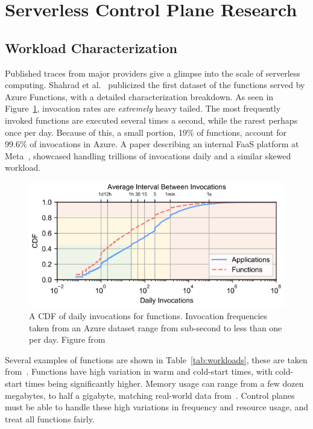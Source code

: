 \section{Serverless Control Plane Research}
\label{sec:related}


\subsection{Workload Characterization}
Published traces from major providers give a glimpse into the scale of serverless computing.
Shahrad et al.~\cite{shahrad_serverless_2020} publicized the first dataset of the functions served by Azure Functions, with a detailed characterization breakdown.
As seen in Figure~\ref{fig:wild-invokes}, invocation rates are \emph{extremely} heavy tailed.
The most frequently invoked functions are executed several times a second, while the rarest perhaps once per day.
Because of this, a small portion, 19\% of functions, account for 99.6\% of invocations in Azure.
A paper describing an internal FaaS platform at Meta~\cite{sahraei2023xfaas}, showcased handling trillions of invocations daily and a similar skewed workload.

\begin{figure}
  \begin{center}
    \includegraphics[width=.9\columnwidth]{./figures/wild-invocations.png}
    \caption{A CDF of daily invocations for functions. 
              Invocation frequencies taken from an Azure dataset range from sub-second to less than one per day. 
              Figure from~\cite{shahrad_serverless_2020}}
  \label{fig:wild-invokes}
\end{center}
\end{figure}


Several examples of functions are shown in Table~\ref{tab:workloads}, these are taken from~\cite{functionbench}.
Functions have high variation in warm and cold-start times, with cold-start times being significantly higher.
Memory usage can range from a few dozen megabytes, to half a gigabyte, matching real-world data from~\cite{shahrad_serverless_2020}.
Control planes must be able to handle these high variations in frequency and resource usage, and treat all functions fairly.

